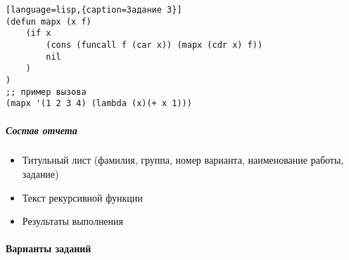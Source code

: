 \documentclass[a4paper,12pt]{article}
\begin{document}
\begin{lstlisting}[language=lisp,{caption=Задание 3}]
(defun mapx (x f) 
	(if x
		(cons (funcall f (car x)) (mapx (cdr x) f))
		nil
	)
)
;; пример вызова
(mapx '(1 2 3 4) (lambda (x)(+ x 1)))
\end{lstlisting}

\subparagraph{Состав отчета}
\begin{itemize}
	\item Титульный лист (фамилия, группа, номер варианта, наименование работы, задание)
	\item Текст рекурсивной функции
	\item Результаты выполнения
\end{itemize}

\paragraph{Варианты заданий}
\end{document}
